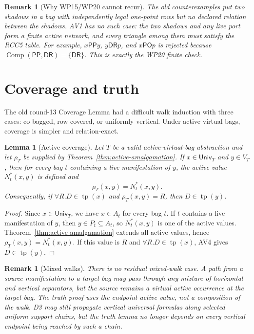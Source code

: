 \documentclass[11pt]{article}
\newtheorem{lemma}[theorem]{Lemma}
\newtheorem{remark}[theorem]{Remark}
\newcommand{\PP}{\mathsf{PP}}
\newcommand{\PO}{\mathsf{PO}}
\newcommand{\DR}{\mathsf{DR}}
\newcommand{\Comp}{\operatorname{Comp}}
\newcommand{\tp}{\operatorname{tp}}
\newcommand{\Univ}{\mathsf{Univ}}
\begin{document}
\begin{remark}[Why WP15/WP20 cannot recur]
The old counterexamples put two shadows in a bag with independently legal
one-point rows but no declared relation between the shadows.  AV1 has no such
case: the two shadows and any live port form a finite active network, and every
triangle among them must satisfy the RCC5 table.  For example,
\(x\PP y\), \(y\DR p\), and \(x\PO p\) is rejected because
\(\Comp(\PP,\DR)=\{\DR\}\).  This is exactly the WP20 finite check.
\end{remark}

\section{Coverage and truth}

The old round-13 Coverage Lemma had a difficult walk induction with three
cases: co-bagged, row-covered, or uniformly vertical.  Under active virtual
bags, coverage is simpler and relation-exact.

\begin{lemma}[Active coverage]\label{lem:active-coverage}
Let \(T\) be a valid active-virtual-bag abstraction and let
\(\rho_T\) be supplied by Theorem~\ref{thm:active-amalgamation}.  If
\(x\in\Univ_T\) and \(y\in V_T\), then for every bag \(t\) containing a live
manifestation of \(y\), the active value \(N^*_t(x,y)\) is defined and
\[
  \rho_T(x,y)=N^*_t(x,y).
\]
Consequently, if \(\forall R.D\in\tp(x)\) and \(\rho_T(x,y)=R\), then
\(D\in\tp(y)\).
\end{lemma}

\begin{proof}
Since \(x\in\Univ_T\), we have \(x\in A_t\) for every bag \(t\).  If \(t\)
contains a live manifestation of \(y\), then \(y\in P_t\subseteq A_t\), so
\(N^*_t(x,y)\) is one of the active values.  Theorem~\ref{thm:active-amalgamation}
extends all active values, hence \(\rho_T(x,y)=N^*_t(x,y)\).  If this value is
\(R\) and \(\forall R.D\in\tp(x)\), AV4 gives \(D\in\tp(y)\).
\end{proof}

\begin{remark}[Mixed walks]
There is no residual mixed-walk case.  A path from a source manifestation to a
target bag may pass through any mixture of horizontal and vertical separators,
but the source remains a virtual active occurrence at the target bag.  The
truth proof uses the endpoint active value, not a composition of the walk.  D3
may still propagate vertical universal formulas along selected uniform support
chains, but the truth lemma no longer depends on every vertical endpoint being
reached by such a chain.
\end{remark}
\end{document}
